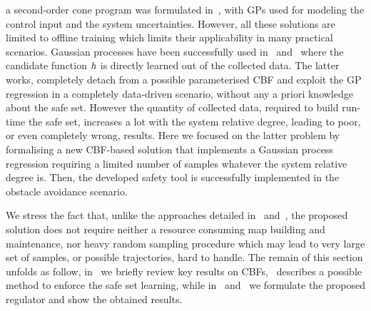 a second-order cone program was formulated in~\cite{castaneda2021gaussian}, with GPs used for modeling the control input and the system uncertainties.
However, all these solutions are limited to offline training which limits their applicability in many practical scenarios.
Gaussian processes have been successfully used in~\cite{khan2021safety} and~\cite{khan2022gaussian} where the candidate function $h$
is directly learned out of the collected data. The latter works, completely detach from a possible parameterised CBF and exploit the
GP regression in a completely data-driven scenario, without any a priori knowledge about the safe set.
However the quantity of collected data, required to build run-time the safe set, increases a lot with the system relative degree,
leading to poor, or even completely wrong, results.
Here we focused on the latter problem by formalising a new CBF-based solution that implements a Gaussian process regression 
requiring a limited number of samples whatever the system relative degree is. Then, the developed safety tool is successfully
implemented in the obstacle avoidance scenario.

We stress the fact that, unlike the approaches detailed in~ and~,
the proposed solution does not require neither a resource consuming map building and maintenance, nor heavy 
random sampling procedure which may lead to very large set of samples, or possible trajectories, hard to handle.
The remain of this section unfolds as follow, in~ we briefly review key results on CBFs,~
describes a possible method to enforce the safe set learning, while in~ and~
we formulate the proposed regulator and show the obtained results.


